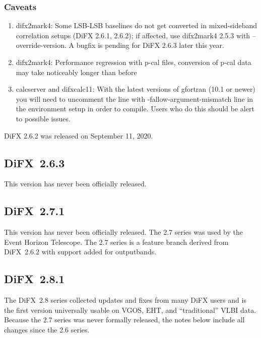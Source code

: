 \subsubsection{Caveats}
\begin{enumerate}
\item difx2mark4: Some LSB-LSB baselines do not get converted in mixed-sideband correlation setups (DiFX 2.6.1, 2.6.2); if affected, use difx2mark4 2.5.3 with –override-version. A bugfix is pending for DiFX 2.6.3 later this year.
\item difx2mark4: Performance regression with p-cal files, conversion of p-cal data may take noticeably longer than before
\item calcserver and difxcalc11: With the latest versions of gfortran (10.1 or newer) you will need to uncomment the line with -fallow-argument-mismatch line in the environment setup in order to compile. Users who do this should be alert to possible issues.
\end{enumerate}

DiFX 2.6.2 was released on September 11, 2020.


\subsection{DiFX~2.6.3}

This version has never been officially released.

\subsection{DiFX~2.7.1}

This version has never been officially released.
The 2.7 series was used by the Event Horizon Telescope.
The 2.7 series is a feature branch derived from DiFX~2.6.2 with support added for outputbands.


\subsection{DiFX~2.8.1}

The DiFX~2.8 series collected updates and fixes from many DiFX users and is the first version universally usable on VGOS, EHT, and ``traditional'' VLBI data.
Because the 2.7 series was never formally released, the notes below include all changes since the 2.6 series.

